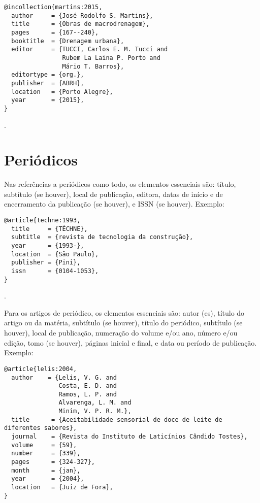 \vspace*{1em}

\begin{verbatim}
@incollection{martins:2015,
  author     = {José Rodolfo S. Martins},
  title      = {Obras de macrodrenagem},
  pages      = {167--240},
  booktitle  = {Drenagem urbana},
  editor     = {TUCCI, Carlos E. M. Tucci and
                Rubem La Laina P. Porto and
                Mário T. Barros},
  editortype = {org.},
  publisher  = {ABRH},
  location   = {Porto Alegre},
  year       = {2015},
}
\end{verbatim}

\noindent
{}.

\section{Periódicos}

Nas referências a periódicos como todo, os elementos essenciais são: título, subtítulo (se houver), local de publicação, editora, datas de início e de encerramento da publicação (se houver), e ISSN (se houver).
Exemplo:

\vspace*{1em}

\begin{verbatim}
@article{techne:1993,
  title     = {TÉCHNE},
  subtitle  = {revista de tecnologia da construção},
  year      = {1993-},
  location  = {São Paulo},
  publisher = {Pini},
  issn      = {0104-1053},
}
\end{verbatim}

\noindent
{}.

\vspace*{1em}

Para os artigos de periódico, os elementos essenciais são: autor (es), título do artigo ou da matéria, subtítulo (se houver), título do periódico, subtítulo (se houver), local de publicação, numeração do volume e/ou ano, número e/ou edição, tomo (se houver), páginas inicial e final, e data ou período de publicação.
Exemplo:

\vspace*{1em}

\begin{verbatim}
@article{lelis:2004,
  author    = {Lelis, V. G. and
               Costa, E. D. and
               Ramos, L. P. and
               Alvarenga, L. M. and
               Minim, V. P. R. M.},
  title      = {Aceitabilidade sensorial de doce de leite de diferentes sabores},
  journal    = {Revista do Instituto de Laticínios Cândido Tostes},
  volume     = {59},
  number     = {339},
  pages      = {324-327},
  month      = {jan},
  year       = {2004},
  location   = {Juiz de Fora},
}
\end{verbatim}

